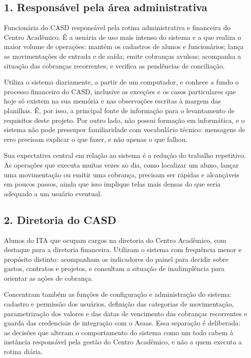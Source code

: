 \documentclass[11pt,a4paper,oneside]{report}
\begin{document}
\subsection*{1. Responsável pela área administrativa}

Funcionária do CASD responsável pela rotina administrativa e financeira do Centro Acadêmico. É a
usuária de uso mais intenso do sistema e a que realiza o maior volume de operações: mantém os
cadastros de alunos e funcionários; lança as movimentações de entrada e de saída; emite cobranças
avulsas; acompanha a situação das cobranças recorrentes; e verifica as pendências de conciliação.

Utiliza o sistema diariamente, a partir de um computador, e conhece a fundo o processo financeiro
do CASD, inclusive as exceções e os casos particulares que hoje só existem na sua memória e nas
observações escritas à margem das planilhas. É, por isso, a principal fonte de informação para o
levantamento de requisitos deste projeto. Por outro lado, não possui formação em informática, e o
sistema não pode pressupor familiaridade com vocabulário técnico: mensagens de erro precisam
explicar o que fazer, e não apenas o que falhou.

Sua expectativa central em relação ao sistema é a redução do trabalho repetitivo. As operações que
executa muitas vezes ao dia, como localizar um aluno, lançar uma movimentação ou emitir uma
cobrança, precisam ser rápidas e alcançáveis em poucos passos, ainda que isso implique telas mais
densas do que seria adequado a um usuário eventual.

\subsection*{2. Diretoria do CASD}

Alunos do ITA que ocupam cargos na diretoria do Centro Acadêmico, com destaque para a diretoria
financeira. Utilizam o sistema com frequência menor e propósito distinto: acompanham os indicadores
do painel para decidir sobre gastos, contratos e projetos, e consultam a situação de inadimplência
para orientar as ações de cobrança.

Concentram também as funções de configuração e administração do sistema: cadastro e permissão dos
usuários, definição das categorias de movimentação, parametrização dos valores e das datas de
vencimento das cobranças recorrentes e guarda das credenciais de integração com o Asaas. Essa
separação é deliberada: as decisões que alteram o comportamento do sistema como um todo cabem à
instância responsável pela gestão do Centro Acadêmico, e não a quem executa a rotina diária.
\end{document}
